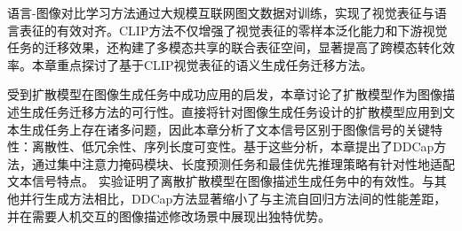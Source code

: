 
语言-图像对比学习方法通过大规模互联网图文数据对训练，实现了视觉表征与语言表征的有效对齐。CLIP方法不仅增强了视觉表征的零样本泛化能力和下游视觉任务的迁移效果，还构建了多模态共享的联合表征空间，显著提高了跨模态转化效率。本章重点探讨了基于CLIP视觉表征的语义生成任务迁移方法。

受到扩散模型在图像生成任务中成功应用的启发，本章讨论了扩散模型作为图像描述生成任务迁移方法的可行性。直接将针对图像生成任务设计的扩散模型应用到文本生成任务上存在诸多问题，因此本章分析了文本信号区别于图像信号的关键特性：离散性、低冗余性、序列长度可变性。基于这些分析，本章提出了DDCap方法，通过集中注意力掩码模块、长度预测任务和最佳优先推理策略有针对性地适配文本信号特点。
实验证明了离散扩散模型在图像描述生成任务中的有效性。与其他并行生成方法相比，DDCap方法显著缩小了与主流自回归方法间的性能差距，并在需要人机交互的图像描述修改场景中展现出独特优势。



